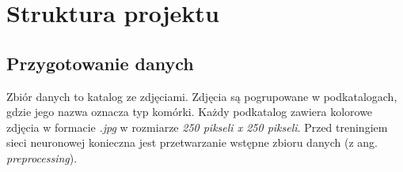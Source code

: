 %
%
%
%
%
%
%

\section{Struktura projektu}

\subsection{Przygotowanie danych}

Zbiór danych to katalog ze zdjęciami. Zdjęcia są pogrupowane w podkatalogach, gdzie jego nazwa oznacza typ komórki.
Każdy podkatalog zawiera kolorowe zdjęcia w formacie \textit{.jpg} w rozmiarze \textit{250 pikseli x 250 pikseli}.
Przed treningiem sieci neuronowej konieczna jest przetwarzanie wstępne zbioru danych (z ang. \textit{preprocessing}).

